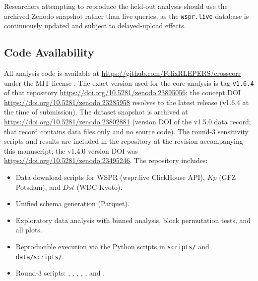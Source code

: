 \documentclass{agujournal2019}
\providecommand{\DIFaddtex}[1]{{\protect\color{blue}\uwave{#1}}} %
\providecommand{\DIFaddbegin}{} %
\providecommand{\DIFaddend}{} %
\providecommand{\DIFadd}[1]{\texorpdfstring{\DIFaddtex{#1}}{#1}} %
\providecommand{\DIFaddincludegraphics}[2][]{{\color{blue}\fbox{\DIFOincludegraphics[#1]{#2}}}} %
\DeclareRobustCommand{\DIFaddbegin}{\DIFOaddbegin \let\includegraphics\DIFaddincludegraphics} %
\DeclareRobustCommand{\DIFaddend}{\DIFOaddend \let\includegraphics\DIFOincludegraphics} %
\begin{document}
{\sloppy
Researchers attempting to reproduce the held-out analysis should use the
archived Zenodo snapshot rather than live queries, as the
\texttt{wspr.live} database is continuously updated and subject to
delayed-upload effects.
\par}

\subsection*{Code Availability}

All analysis code is available at
\url{https://github.com/FelixRLEPERS/crosscorr}
under the MIT license \DIFaddbegin \DIFadd{\mbox{%
\citep{crosscorr_code}}\hskip0pt%
}\DIFaddend . The exact version used for the
core analysis is tag \texttt{v1.6.4} of that repository \DIFaddbegin \DIFadd{(version DOI
}\url{https://doi.org/10.5281/zenodo.23895056}\DIFadd{)}\DIFaddend ; the concept DOI
\url{https://doi.org/10.5281/zenodo.23285958} resolves to the latest
release (v1.6.4 at the time of submission). The dataset snapshot is
archived at
\url{https://doi.org/10.5281/zenodo.23802881} (version DOI of the
v1.5.0 data record; that record contains data files only and no source
code). The round-3 sensitivity scripts and results are included in
the repository at the revision accompanying this manuscript; the
v1.4.0 version DOI was
\url{https://doi.org/10.5281/zenodo.23495246}. The repository includes:

{\sloppy
\begin{itemize}
	\item Data download scripts for WSPR (wspr.live ClickHouse API),
	      $Kp$ (GFZ Potsdam), and $Dst$ (WDC Kyoto).
	\item Unified schema generation (Parquet).
	\item Exploratory data analysis with binned analysis, block permutation
	      tests, and all plots.
	\item Reproducible execution via the Python scripts in \texttt{scripts/} and \texttt{data/scripts/}.
	\item Round-3 scripts: ,
	      ,
	      ,
	      ,
	      , and
	      .
\end{itemize}
\par}


\end{document}
